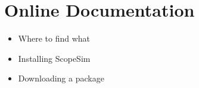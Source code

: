 

\section{Online Documentation%
  \label{online-documentation}%
}

\begin{itemize}
\item Where to find what

\item Installing ScopeSim

\item Downloading a package
\end{itemize}
